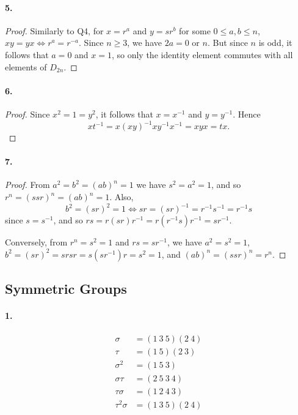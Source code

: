 \documentclass{article}
\begin{document}
\paragraph{5.}
\begin{proof}
  Similarly to Q4, for $x = r^a$ and $y = sr^b$ for some $0 \leq a, b \leq n$, 
  $xy = yx \iff r^a = r^{-a}$. Since $n \geq 3$, we have $2a = 0\text{ or }n$.
  But since $n$ is odd, it follows that $a = 0$ and $x = 1$, so only the
  identity element commutes with all elements of $D_{2n}$.
\end{proof}

\paragraph{6.}
\begin{proof}
  Since $x^2 = 1 = y^2$, it follows that $x = x^{-1}$ and $y = y^{-1}$. Hence \[
    xt^{-1} = x(xy)^{-1}xy^{-1}x^{-1} = xyx = tx.
  \]
\end{proof}

\paragraph{7.}
\begin{proof}
  From $a^2 = b^2 = (ab)^n = 1$ we have $s^2 = a^2 = 1$, and so $r^n = (ssr)^n
  = (ab)^n = 1$. Also, \[
    b^2 = (sr)^2 = 1 \iff sr = (sr)^{-1} = r^{-1}s^{-1} = r^{-1}s
  \] since $s = s^{-1}$, and so $rs = r(sr)r^{-1} = r(r^{-1}s)r^{-1} = sr^{-1}$.

  Conversely, from $r^n = s^2 = 1$ and $rs = sr^{-1}$, we have $a^2 = s^2 = 1$,
  $b^2 = (sr)^2 = srsr = s(sr^{-1})r = s^2 = 1$, and $(ab)^n = (ssr)^n = r^n$.
\end{proof}

\subsection{Symmetric Groups}

\paragraph{1.}
\begin{align*}
  \sigma &= (1\ 3\ 5)(2\ 4) \\
  \tau &= (1\ 5)(2\ 3) \\
  \sigma^2 &= (1\ 5\ 3) \\
  \sigma\tau &= (2\ 5\ 3\ 4) \\
  \tau\sigma &= (1\ 2\ 4\ 3) \\
  \tau^2\sigma &= (1\ 3\ 5)(2\ 4)
\end{align*}
\end{document}
